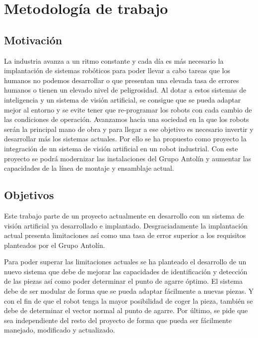\chapter{Metodología de trabajo}
\label{chap:Metodologia de trabajo}

\section{Motivación}
\label{chap:Metodología sec:Motivación}
La industria avanza a un ritmo constante y cada día es más necesario la implantación de sistemas robóticos para poder llevar a cabo tareas que los humanos no podemos desarrollar o que presentan una elevada tasa de errores humanos o tienen un elevado nivel de peligrosidad. Al dotar a estos sistemas de inteligencia y un sistema de visión artificial, se consigue que se pueda adaptar mejor al entorno y se evite tener que re-programar los robots con cada cambio de las condiciones de operación. Avanzamos hacia una sociedad en la que los robots serán la principal mano de obra y para llegar a ese objetivo es necesario invertir y desarrollar más los sistemas actuales. Por ello se ha propuesto como proyecto la integración de un sistema de visión artificial en un robot industrial. Con este proyecto se podrá modernizar las instalaciones del Grupo Antolín\textsuperscript{\textregistered} y aumentar las capacidades de la línea de montaje y ensamblaje actual.

\section{Objetivos}
\label{chap:Metodología sec:Objetivos}
Este trabajo parte de un proyecto actualmente en desarrollo con un sistema de visión artificial ya desarrollado e implantado. Desgraciadamente la implantación actual presenta limitaciones así como una tasa de error superior a los requisitos planteados por el Grupo Antolín.

Para poder superar las limitaciones actuales se ha planteado el desarrollo de un nuevo sistema que debe de mejorar las capacidades de identificación y detección de las piezas así como poder determinar el punto de agarre óptimo. El sistema debe de ser modular de forma que se pueda adaptar fácilmente a nuevas piezas. Y con el fin de que el robot tenga la mayor posibilidad de coger la pieza, también se debe de determinar el vector normal al punto de agarre. Por último, se pide que sea independiente del resto del proyecto de forma que pueda ser fácilmente manejado, modificado y actualizado.

